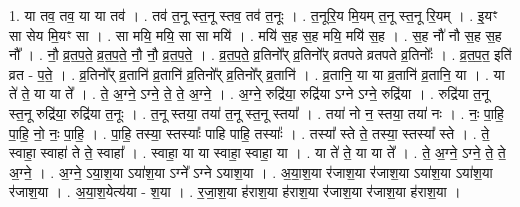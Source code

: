 \documentclass[17pt]{extarticle}
\begin{document}
1. या तव॒ तव॒ या या तव॑ । . तव॑ त॒नू स्त॒नू स्तव॒ तव॑ त॒नूः । . त॒नूरि॒य मि॒यम् त॒नू स्त॒नू रि॒यम् । . इ॒यꣳ सा सेय मि॒यꣳ सा । . सा मयि॒ मयि॒ सा सा मयि॑ । . मयि॑ स॒ह स॒ह मयि॒ मयि॑ स॒ह । . स॒ह नौ॑ नौ स॒ह स॒ह नौ᳚ । . नौ॒ व्र॒त॒प॒ते॒ व्र॒त॒प॒ते॒ नौ॒ नौ॒ व्र॒त॒प॒ते॒ । . व्र॒त॒प॒ते॒ व्र॒तिनो᳚र् व्र॒तिनो᳚र् व्रतपते व्रतपते व्र॒तिनोः᳚ । . व्र॒त॒प॒त॒ इति॑ व्रत - प॒ते॒ । . व्र॒तिनो᳚र् व्र॒तानि॑ व्र॒तानि॑ व्र॒तिनो᳚र् व्र॒तिनो᳚र् व्र॒तानि॑ । . व्र॒तानि॒ या या व्र॒तानि॑ व्र॒तानि॒ या । . या ते॑ ते॒ या या ते᳚ । . ते॒ अ॒ग्ने॒ ऽग्ने॒ ते॒ ते॒ अ॒ग्ने॒ । . अ॒ग्ने॒ रुद्रि॑या॒ रुद्रि॑या ऽग्ने ऽग्ने॒ रुद्रि॑या । . रुद्रि॑या त॒नू स्त॒नू रुद्रि॑या॒ रुद्रि॑या त॒नूः । . त॒नू स्तया॒ तया॑ त॒नू स्त॒नू स्तया᳚ । . तया॑ नो न॒ स्तया॒ तया॑ नः । . नः॒ पा॒हि॒ पा॒हि॒ नो॒ नः॒ पा॒हि॒ । . पा॒हि॒ तस्या॒ स्तस्याः᳚ पाहि पाहि॒ तस्याः᳚ । . तस्या᳚ स्ते ते॒ तस्या॒ स्तस्या᳚ स्ते । . ते॒ स्वाहा॒ स्वाहा॑ ते ते॒ स्वाहा᳚ । . स्वाहा॒ या या स्वाहा॒ स्वाहा॒ या । . या ते॑ ते॒ या या ते᳚ । . ते॒ अ॒ग्ने॒ ऽग्ने॒ ते॒ ते॒ अ॒ग्ने॒ । . अ॒ग्ने॒ ऽया॒श॒या ऽया॑श॒या ऽग्ने᳚ ऽग्ने ऽयाश॒या । . अ॒या॒श॒या र॑जाश॒या र॑जाश॒या ऽया॑श॒या ऽया॑श॒या र॑जाश॒या । . अ॒या॒श॒येत्य॑या - श॒या । . र॒जा॒श॒या ह॑राश॒या ह॑राश॒या र॑जाश॒या र॑जाश॒या ह॑राश॒या । \newline
\end{document}

